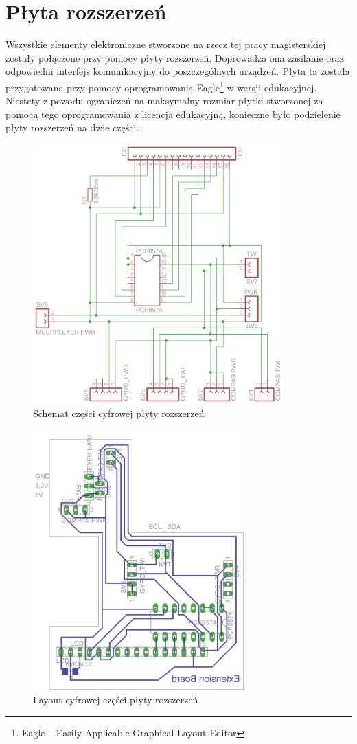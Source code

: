 \section{Płyta rozszerzeń}
Wszystkie elementy elektroniczne stworzone na rzecz tej pracy magisterskiej zostały połączone przy pomocy płyty rozszerzeń. Doprowadza ona zasilanie oraz odpowiedni interfejs komunikacyjny do poszczególnych urządzeń. Płyta ta została przygotowana przy pomocy oprogramowania Eagle\footnote{Eagle -- Easily Applicable Graphical Layout Editor} w wersji edukacyjnej. Niestety z powodu ograniczeń na maksymalny rozmiar płytki stworzonej za pomocą tego oprogramowania z licencja edukacyjną, konieczne było podzielenie płyty rozszerzeń na dwie części. 

\begin{figure}[!ht]
 \centering
 \includegraphics[height=100mm]{../images/ch04/extension_board-sch.png}
 \caption{Schemat części cyfrowej płyty rozszerzeń}
 \label{fig:KmakPlatform}
\end{figure}

\begin{figure}[!ht]
 \centering
 \includegraphics[height=100mm]{../images/ch04/extension_board.png}
 \caption{Layout cyfrowej części płyty rozszerzeń}
 \label{fig:KmakPlatform}
\end{figure}

